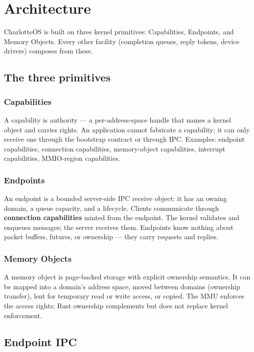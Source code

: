 \chapter{Architecture}

CharlotteOS is built on three kernel primitives: Capabilities, Endpoints, and
Memory Objects. Every other facility (completion queues, reply tokens, device
drivers) composes from these.

\section{The three primitives}

\subsection{Capabilities}

A capability is authority --- a per-address-space handle that names a kernel
object and carries rights. An application cannot fabricate a capability; it can
only receive one through the bootstrap contract or through IPC. Examples:
endpoint capabilities, connection capabilities, memory-object capabilities,
interrupt capabilities, MMIO-region capabilities.

\subsection{Endpoints}

An endpoint is a bounded server-side IPC receive object: it has an owning
domain, a queue capacity, and a lifecycle. Clients communicate through
\textbf{connection capabilities} minted from the endpoint. The kernel validates
and enqueues messages; the server receives them. Endpoints know nothing about
packet buffers, futures, or ownership --- they carry requests and replies.

\subsection{Memory Objects}

A memory object is page-backed storage with explicit ownership semantics. It can
be mapped into a domain's address space, moved between domains (ownership
transfer), lent for temporary read or write access, or copied. The MMU enforces
the access rights; Rust ownership complements but does not replace kernel
enforcement.

\section{Endpoint IPC}

